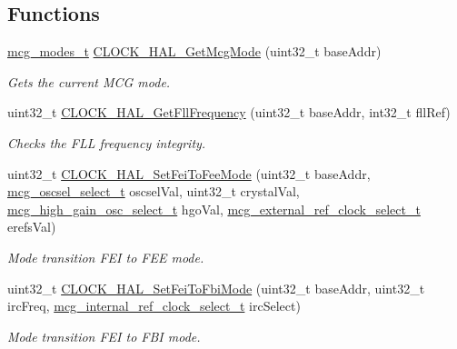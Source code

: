 \subsection*{Functions}
\begin{DoxyCompactItemize}
\item 
\hyperlink{group__mcg__hal_ga45a80628effb092af4a7a4a381477b91}{mcg\+\_\+modes\+\_\+t} \hyperlink{group__mcg__hal_ga6d171e871b27ffd2ef9924378f7f881f}{C\+L\+O\+C\+K\+\_\+\+H\+A\+L\+\_\+\+Get\+Mcg\+Mode} (uint32\+\_\+t base\+Addr)
\begin{DoxyCompactList}\small\item\em Gets the current M\+CG mode. \end{DoxyCompactList}\item 
uint32\+\_\+t \hyperlink{group__mcg__hal_ga6ac3fcf481746e51a967b38367a73efe}{C\+L\+O\+C\+K\+\_\+\+H\+A\+L\+\_\+\+Get\+Fll\+Frequency} (uint32\+\_\+t base\+Addr, int32\+\_\+t fll\+Ref)
\begin{DoxyCompactList}\small\item\em Checks the F\+LL frequency integrity. \end{DoxyCompactList}\item 
uint32\+\_\+t \hyperlink{group__mcg__hal_ga04adbe484482447ef7172308e676e466}{C\+L\+O\+C\+K\+\_\+\+H\+A\+L\+\_\+\+Set\+Fei\+To\+Fee\+Mode} (uint32\+\_\+t base\+Addr, \hyperlink{group__mcg__hal_ga199389ca614bebd5d3a6a32b1d5c558c}{mcg\+\_\+oscsel\+\_\+select\+\_\+t} oscsel\+Val, uint32\+\_\+t crystal\+Val, \hyperlink{group__mcg__hal_ga7218a02fa6a0189cb9b1e4e521bd682b}{mcg\+\_\+high\+\_\+gain\+\_\+osc\+\_\+select\+\_\+t} hgo\+Val, \hyperlink{group__mcg__hal_ga9644a6c2e01b6262770ade769051224d}{mcg\+\_\+external\+\_\+ref\+\_\+clock\+\_\+select\+\_\+t} erefs\+Val)
\begin{DoxyCompactList}\small\item\em Mode transition F\+EI to F\+EE mode. \end{DoxyCompactList}\item 
uint32\+\_\+t \hyperlink{group__mcg__hal_ga683fa902b27ca51ababa30f019158f86}{C\+L\+O\+C\+K\+\_\+\+H\+A\+L\+\_\+\+Set\+Fei\+To\+Fbi\+Mode} (uint32\+\_\+t base\+Addr, uint32\+\_\+t irc\+Freq, \hyperlink{group__mcg__hal_ga9738d5cb312dacd7c75d2ed599ad48c7}{mcg\+\_\+internal\+\_\+ref\+\_\+clock\+\_\+select\+\_\+t} irc\+Select)
\begin{DoxyCompactList}\small\item\em Mode transition F\+EI to F\+BI mode. \end{DoxyCompactList}\item 

\end{DoxyCompactItemize}
